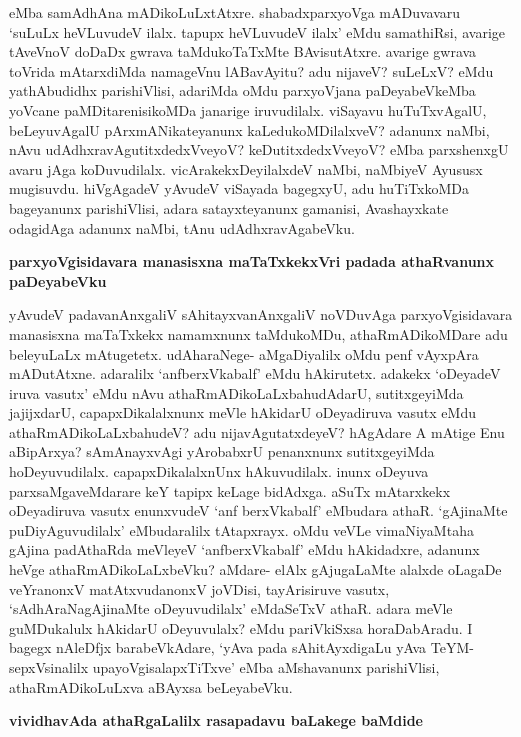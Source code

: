 eMba samAdhAna mADikoLuLxtAtxre. shabadxparxyoVga mADuvavaru `suLuLx heVLuvudeV ilalx. tapupx heVLuvudeV ilalx' eMdu samathiRsi, avarige tAveVnoV doDaDx gwrava taMdukoTaTxMte BAvisutAtxre. avarige gwrava toVrida mAtarxdiMda namageVnu lABavAyitu? adu nijaveV? suLeLxV? eMdu yathAbudidhx parishiVlisi, adariMda oMdu parxyoVjana paDeyabeVkeMba yoVcane paMDitarenisikoMDa janarige iruvudilalx. viSayavu huTuTxvAgalU, beLeyuvAgalU pArxmANikateyanunx kaLedukoMDilalxveV? adanunx naMbi, nAvu udAdhxravAgutitxdedxVveyoV? keDutitxdedxVveyoV? eMba parxshenxgU avaru jAga koDuvudilalx. vicArakekxDeyilalxdeV naMbi, naMbiyeV Ayususx mugisuvdu. hiVgAgadeV yAvudeV viSayada bagegxyU, adu huTiTxkoMDa bageyanunx parishiVlisi, adara satayxteyanunx gamanisi, Avashayxkate odagidAga adanunx naMbi, tAnu udAdhxravAgabeVku.

\noindent
{\bf\large{parxyoVgisidavara manasisxna maTaTxkekxVri padada athaRvanunx paDeyabeVku}}\label{page216}

yAvudeV padavanAnxgaliV sAhitayxvanAnxgaliV noVDuvAga parxyoVgisidavara manasisxna maTaTxkekx namamxnunx taMdukoMDu, athaRmADikoMDare adu beleyuLaLx mAtugetetx. udAharaNege- aMgaDiyalilx oMdu penf vAyxpAra mADutAtxne. adaralilx `anfberxVkabalf' eMdu hAkirutetx. adakekx `oDeyadeV iruva vasutx' eMdu nAvu athaRmADikoLaLxbahudAdarU, sutitxgeyiMda jajijxdarU, capapxDikalalxnunx meVle hAkidarU oDeyadiruva vasutx eMdu athaRmADikoLaLxbahudeV? adu nijavAgutatxdeyeV? hAgAdare A mAtige Enu aBipArxya? sAmAnayxvAgi yArobabxrU penanxnunx sutitxgeyiMda hoDeyuvudilalx. capapxDikalalxnUnx hAkuvudilalx. inunx oDeyuva parxsaMgaveMdarare keY tapipx keLage bidAdxga. aSuTx mAtarxkekx oDeyadiruva vasutx enunxvudeV `anf berxVkabalf' eMbudara athaR. `gAjinaMte puDiyAguvudilalx' eMbudaralilx tAtapxrayx. oMdu veVLe vimaNiyaMtaha gAjina padAthaRda meVleyeV `anfberxVkabalf' eMdu hAkidadxre, adanunx heVge athaRmADikoLaLxbeVku? aMdare- elAlx gAjugaLaMte alalxde oLagaDe veYranonxV matAtxvudanonxV joVDisi, tayArisiruve vasutx, `sAdhAraNagAjinaMte oDeyuvudilalx' eMdaSeTxV athaR. adara meVle guMDukalulx hAkidarU oDeyuvulalx? eMdu pariVkiSxsa horaDabAradu. I bagegx nAleDfjx barabeVkAdare, `yAva pada sAhitAyxdigaLu yAva TeYM-sepxVsinalilx upayoVgisalapxTiTxve' eMba aMshavanunx parishiVlisi, athaRmADikoLuLxva aBAyxsa beLeyabeVku.

\noindent
{\bf\large{vividhavAda athaRgaLalilx rasapadavu baLakege baMdide}}\label{page217}

